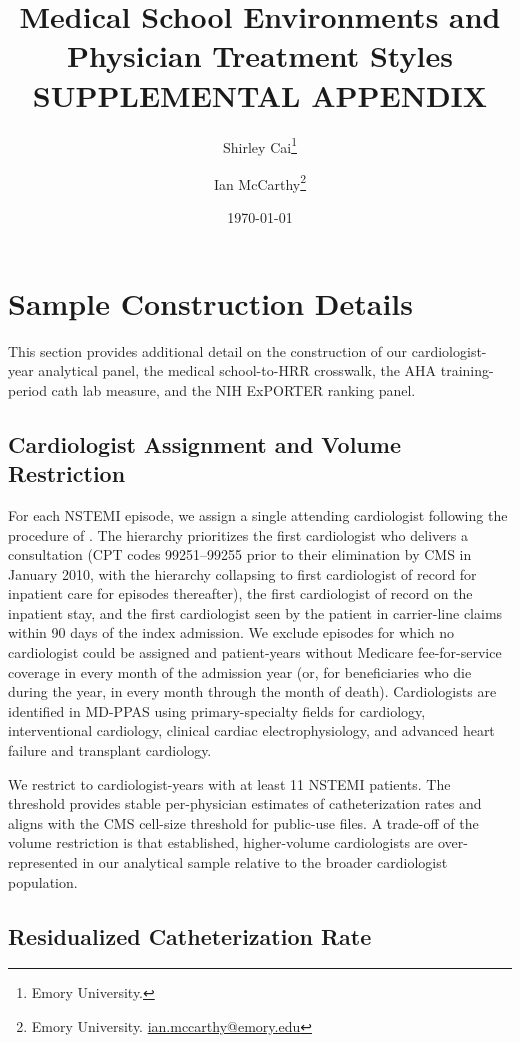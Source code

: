 \documentclass[12pt]{article}
\title{Medical School Environments and Physician Treatment Styles \\[0.5em]
\large SUPPLEMENTAL APPENDIX}
\author{Shirley Cai\thanks{Emory University.} \and Ian McCarthy\thanks{Emory University.
\href{mailto:ian.mccarthy@emory.edu}{ian.mccarthy@emory.edu}}}
\date{\today}
\let\textcite\citet
\begin{document}
\maketitle

\section{Sample Construction Details}\label{sec:app-sample}

This section provides additional detail on the construction of our cardiologist-year analytical panel, the medical school-to-HRR crosswalk, the AHA training-period cath lab measure, and the NIH ExPORTER ranking panel.

\subsection{Cardiologist Assignment and Volume Restriction}

For each NSTEMI episode, we assign a single attending cardiologist following the procedure of \textcite{molitor2018}. The hierarchy prioritizes the first cardiologist who delivers a consultation (CPT codes 99251--99255 prior to their elimination by CMS in January 2010, with the hierarchy collapsing to first cardiologist of record for inpatient care for episodes thereafter), the first cardiologist of record on the inpatient stay, and the first cardiologist seen by the patient in carrier-line claims within 90 days of the index admission. We exclude episodes for which no cardiologist could be assigned and patient-years without Medicare fee-for-service coverage in every month of the admission year (or, for beneficiaries who die during the year, in every month through the month of death). Cardiologists are identified in MD-PPAS using primary-specialty fields for cardiology, interventional cardiology, clinical cardiac electrophysiology, and advanced heart failure and transplant cardiology.

We restrict to cardiologist-years with at least 11 NSTEMI patients. The threshold provides stable per-physician estimates of catheterization rates and aligns with the CMS cell-size threshold for public-use files. A trade-off of the volume restriction is that established, higher-volume cardiologists are over-represented in our analytical sample relative to the broader cardiologist population.

\subsection{Residualized Catheterization Rate}
\end{document}
